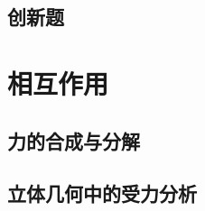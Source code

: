 \documentclass[cn,blue,11pt,normal]{elegantnote}
\begin{document}
\subsection{创新题}
\begin{proset}
	
\end{proset}
\begin{proset}
	
\end{proset}


\newpage
\section{相互作用}

\subsection{力的合成与分解}

\begin{proset}
	
\end{proset}
\begin{proset}
	
\end{proset}
\begin{proset}
	
\end{proset}

\begin{proset}
	
\end{proset}


\begin{proset}
	
\end{proset}
\begin{proset}
	
\end{proset}

\begin{proset}
	
\end{proset}

\begin{proset}
	
\end{proset}
\begin{proset}
	
\end{proset}

\subsection{立体几何中的受力分析}
\begin{proset}
	
\end{proset}
\end{document}
